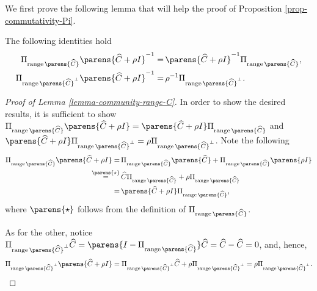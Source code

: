 We first prove the following lemma that will help the proof of Proposition \ref{prop-commutativity-Pi}. 

\begin{lemma}\label{lemma-community-range-C}
	The following identities hold 
	\begin{align*}
		\Pi_{\range \parens{\widehat{C}}} \parens{\widehat{C} + \rho I}^{-1} = & \, \parens{\widehat{C} + \rho I}^{-1} \Pi_{\range \parens{\widehat{C}}},  \\ 
		\Pi_{\range \parens{\widehat{C}}^{\perp}} \parens{\widehat{C} + \rho I}^{-1} = & \, \rho^{-1} \Pi_{\range \parens{\widehat{C}}^{\perp}}. 
	\end{align*}
\end{lemma}

\begin{proof}[Proof of Lemma \ref{lemma-community-range-C}]
	In order to show the desired results, it is sufficient to show $\Pi_{\range \parens{\widehat{C}}} \parens{\widehat{C} + \rho I} = \parens{\widehat{C} + \rho I} \Pi_{\range \parens{\widehat{C}}}$ and $\parens{\widehat{C} + \rho I} \Pi_{\range \parens{\widehat{C}}^{\perp}}  = \rho \Pi_{\range \parens{\widehat{C}}^{\perp}} $. Note the following 
	\begin{align*}
		\Pi_{\range \parens{\widehat{C}}} \parens{\widehat{C} + \rho I} 
		= & \, \Pi_{\range \parens{\widehat{C}}} \parens{\widehat{C}} + \Pi_{\range \parens{\widehat{C}}} \parens{\rho I} \\ 
		\stackrel{\parens{\star}}{=} & \, \widehat{C} \Pi_{\range \parens{\widehat{C}}} + \rho \Pi_{\range \parens{\widehat{C}}} \\ 
		= & \, \parens{\widehat{C} + \rho I} \Pi_{\range \parens{\widehat{C}}},  
	\end{align*}
	where $\parens{\star}$ follows from the definition of $\Pi_{\range \parens{\widehat{C}}}$. 
	
	As for the other, notice $\Pi_{\range \parens{\widehat{C}}^{\perp}} \widehat{C} = \parens{I - \Pi_{\range \parens{\widehat{C}}}} \widehat{C} = \widehat{C} - \widehat{C} = 0$, and, hence,  
	\begin{align*}
		\Pi_{\range \parens{\widehat{C}}^{\perp}} \parens{\widehat{C} + \rho I} = \Pi_{\range \parens{\widehat{C}}^{\perp}} \widehat{C} + \rho \Pi_{\range \parens{\widehat{C}}^{\perp}} = \rho \Pi_{\range \parens{\widehat{C}}^{\perp}}. 
	\end{align*}
\end{proof}

